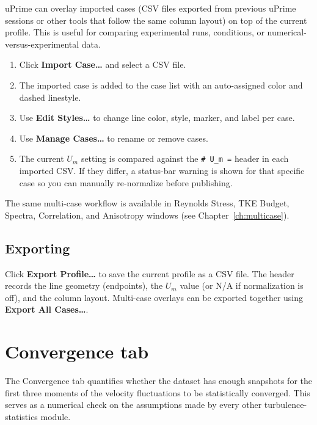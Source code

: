 \documentclass[11pt, a4paper]{report}
\newcommand{\uipth}[1]{\textbf{\textcolor{upblue}{#1}}}
\newcommand{\software}[1]{\textsf{#1}}
\begin{document}
\software{uPrime} can overlay imported cases (CSV files exported from previous \software{uPrime} sessions or other tools that follow the same column layout) on top of the current profile. This is useful for comparing experimental runs, conditions, or numerical-versus-experimental data.

\begin{stepbox}
\begin{enumerate}[leftmargin=1.5em, topsep=2pt]
  \item Click \uipth{Import Case\ldots} and select a CSV file.
  \item The imported case is added to the case list with an auto-assigned color and dashed linestyle.
  \item Use \uipth{Edit Styles\ldots} to change line color, style, marker, and label per case.
  \item Use \uipth{Manage Cases\ldots} to rename or remove cases.
  \item The current $U_m$ setting is compared against the \texttt{\# U\_m =} header in each imported CSV. If they differ, a status-bar warning is shown for that specific case so you can manually re-normalize before publishing.
\end{enumerate}
\end{stepbox}

The same multi-case workflow is available in Reynolds Stress, TKE Budget, Spectra, Correlation, and Anisotropy windows (see Chapter~\ref{ch:multicase}).

\subsection{Exporting}

Click \uipth{Export Profile\ldots} to save the current profile as a CSV file. The header records the line geometry (endpoints), the $U_m$ value (or N/A if normalization is off), and the column layout. Multi-case overlays can be exported together using \uipth{Export All Cases\ldots}.

\section{Convergence tab}
\label{sec:convergence}

The Convergence tab quantifies whether the dataset has enough snapshots for the first three moments of the velocity fluctuations to be statistically converged. This serves as a numerical check on the assumptions made by every other turbulence-statistics module.
\end{document}
